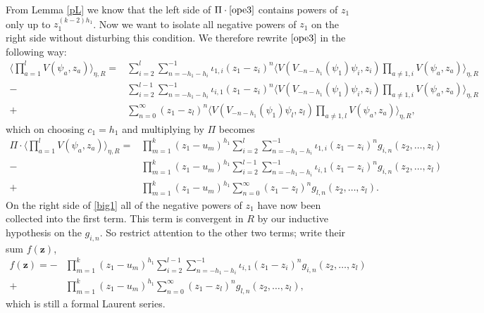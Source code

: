 \documentclass[a4paper,12pt]{article}
\newcommand{\zz}{{\mathbf z}}
\newcommand{\IP}[1]{\langle#1\rangle}
\begin{document}
From Lemma \ref{pL} we know that the left side of $\Pi \cdot \eqref{ope3}$ contains powers of $z_1$ only
up to $z_1^{(k-2)h_1}$.  Now we want to isolate all negative powers of $z_1$ on the right side without
disturbing this condition.  We therefore rewrite $\eqref{ope3}$ in the following way:
\begin{equation} \label{big2}
\begin{split}
\IP{\prod_{a=1}^l V(\psi_a, z_a)}_{\eta,R} = & \sum_{i=2}^{l} \sum_{n = - h_1 - h_i}^{-1} \iota_{1,i} (z_1 - z_i)^{n} \IP{V(V_{-n-h_1}(\psi_1) \psi_i, z_i) \prod_{a \ne 1,i} V(\psi_a, z_a)}_{\eta,R} \\
- & \sum_{i=2}^{l-1} \sum_{n = - h_1 - h_i}^{-1} \iota_{i,1} (z_1 - z_i)^{n} \IP{V(V_{-n-h_1}(\psi_1) \psi_i, z_i) \prod_{a \ne 1,i} V(\psi_a, z_a)}_{\eta,R} \\
+ &\sum_{n = 0}^\infty (z_1 - z_l)^n \IP{V(V_{-n-h_1}(\psi_1) \psi_l, z_l) \prod_{a \ne 1,l} V(\psi_a, z_a)}_{\eta,R},
\end{split}
\end{equation}
which on choosing $c_1 = h_1$ and multiplying by $\Pi$ becomes
\begin{equation} \label{big1}
\begin{split}
\Pi \cdot \IP{\prod_{a=1}^l V(\psi_a, z_a)}_{\eta,R} = & \prod_{m=1}^k (z_1 - u_m)^{h_1} \sum_{i=2}^{l} \sum_{n = - h_1 - h_i}^{-1} \iota_{1,i} (z_1 - z_i)^{n} g_{i,n}(z_2, \dots, z_l) \\
-& \prod_{m=1}^k (z_1 - u_m)^{h_1} \sum_{i=2}^{l-1} \sum_{n = - h_1 - h_i}^{-1} \iota_{i,1} (z_1 - z_i)^{n} g_{i,n}(z_2, \dots, z_l) \\
+& \prod_{m=1}^k (z_1 - u_m)^{h_1} \sum_{n = 0}^\infty (z_1 - z_l)^n g_{l,n}(z_2, \dots, z_l).
\end{split}
\end{equation}
On the right side of \eqref{big1} all of the negative powers of $z_1$ have now been collected into the first term.
This term is
convergent in $R$ by our inductive hypothesis on the $g_{i,n}$.
So restrict attention
to the other two terms; write their sum $f(\zz)$,
\begin{equation} \label{deff}
\begin{split}
f(\zz) = -& \prod_{m=1}^k (z_1 - u_m)^{h_1} \sum_{i=2}^{l-1} \sum_{n = - h_1 - h_i}^{-1} \iota_{i,1} (z_1 - z_i)^{n} g_{i,n}(z_2, \dots, z_l) \\
+& \prod_{m=1}^k (z_1 - u_m)^{h_1} \sum_{n = 0}^\infty (z_1 - z_l)^n g_{l,n}(z_2, \dots, z_l),
\end{split}
\end{equation}
which is still a formal Laurent series.  
\end{document}

